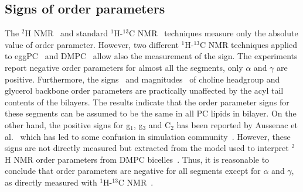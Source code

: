 \documentclass[aps,prl,superscriptaddress,twocolumn]{revtex4}
\begin{document}
\subsection{Signs of order parameters}\label{signSECTION}

The $^2$H NMR~\cite{seelig77c} and standard $^1$H-$^{13}$C NMR~\cite{hong95a,gross97,dvinskikh05a,ferreira13} techniques measure 
only the absolute value of order parameter. However, two different $^1$H-$^{13}$C NMR techniques applied to eggPC~\cite{hong95a} 
and DMPC~\cite{hong95a,gross97} allow also the measurement of the sign.
The experiments report negative order parameters for almost all the segments, only $\alpha$ and $\gamma$ are positive.
Furthermore, the signs~\cite{hong95a,hong95b,gross97} and magnitudes~\cite{gally81,ferreira13,botan15} of choline headgroup 
and glycerol backbone order parameters are practically unaffected by the acyl tail contents of the bilayers. 
The results indicate that the order parameter signs for these segments can be assumed to be the same in all PC lipids in bilayer. 
On the other hand, the positive signs for g$_1$, g$_3$ and C$_2$ has been reported by Aussenac et al.~\cite{aussenac03} 
which has led to some confusion in simulation community~\cite{hogberg06,hogberg08,signPOST}. 
However, these signs are not directly measured but extracted from the model used to interpret 
$^2$H NMR order parameters from DMPC bicelles~\cite{aussenac03}. Thus, it is reasonable to conclude that 
order parameters are negative for all segments except for $\alpha$ and $\gamma$, as 
directly measured with $^1$H-$^{13}$C NMR~\cite{hong95a,hong95b,gross97}.

\end{document}

